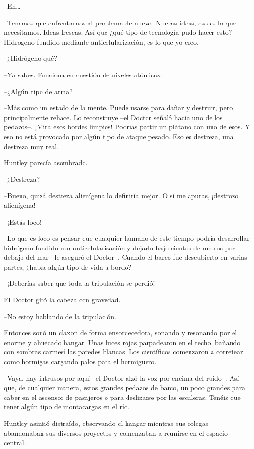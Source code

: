 {--Eh\ldots{}}

{--Tenemos que enfrentarnos al problema de nuevo. Nuevas ideas, eso es
 lo que necesitamos. Ideas frescas. Así que ¿qué tipo de tecnología pudo
 hacer esto? Hidrogeno fundido mediante anticelularización, es lo que yo
creo.}

{--¿Hidrógeno qué?}

{--Ya sabes. Funciona en cuestión de niveles atómicos.}

{--¿Algún tipo de arma?}

{--Más como un estado de la mente. Puede usarse para dañar y destruir,
 pero principalmente rehace. Lo reconstruye --el Doctor señaló hacia uno
 de los pedazos--. ¡Mira esos bordes limpios! Podrías partir un plátano
 con uno de esos. Y eso no está provocado por algún tipo de ataque
pesado. Eso es destreza, una destreza muy real.}

{Huntley parecía asombrado.}

{--¿Destreza?}

{--Bueno, quizá destreza alienígena lo definiría mejor. O si me apuras,
¡destrozo alienígena!}

{--¡Estás loco!}

{--Lo que es loco es pensar que cualquier humano de este tiempo podría
 desarrollar hidrógeno fundido con anticelularización y dejarlo bajo
 cientos de metros por debajo del mar --le aseguró el Doctor--. Cuando el
 barco fue descubierto en varias partes, ¿había algún tipo de vida a
bordo?}

{--¡Deberías saber que toda la tripulación se perdió!}

{El Doctor giró la cabeza con gravedad.}

{--No estoy hablando de la tripulación.}

{Entonces sonó un claxon de forma ensordecedora, sonando y resonando por
 el enorme y ahuecado hangar. Unas luces rojas parpadearon en el techo,
 bañando con sombras carmesí las paredes blancas. Los científicos
comenzaron a corretear como hormigas cargando palos para el hormiguero.}

{--Vaya, hay intrusos por aquí --el Doctor alzó la voz por encima del
 ruido--. Así que, de cualquier manera, estos grandes pedazos de barco,
 un poco grandes para caber en el ascensor de pasajeros o para deslizarse
 por las escaleras. Tenéis que tener algún tipo de montacargas en el
río.}

{Huntley asintió distraído, observando el hangar mientras sus colegas
 abandonaban sus diversos proyectos y comenzaban a reunirse en el espacio
central.}

